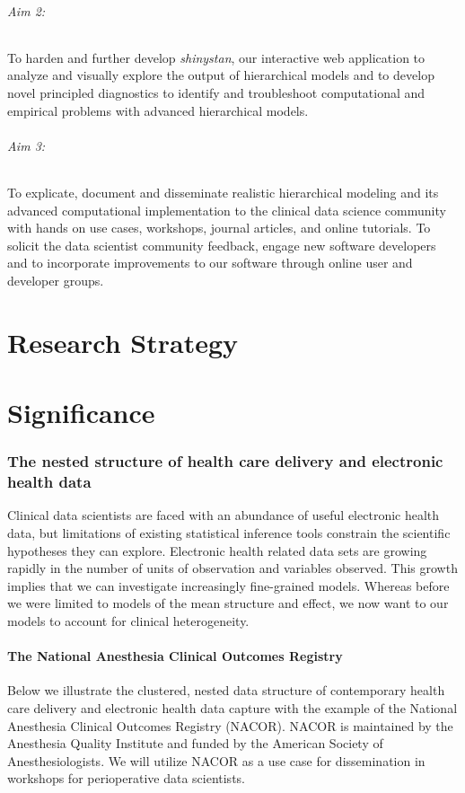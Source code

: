 \documentclass[11pt,notitlepage]{article}
\begin{document}
\paragraph*{Aim 2:} To harden and further develop \textit{shinystan}, our 
interactive web application to analyze and visually explore the output of hierarchical 
models and to develop novel principled diagnostics to identify and troubleshoot
computational and empirical problems with advanced hierarchical models.

\paragraph*{Aim 3:} To explicate, document and disseminate realistic hierarchical 
modeling and its advanced computational implementation to the 
clinical data science community with hands on use cases, workshops, journal articles, and 
online tutorials. To solicit the data scientist community feedback, engage new 
software developers and to incorporate improvements to our software through 
online user and developer groups.

\part*{Research Strategy}

\part*{Significance}

\section*{The nested structure of health care delivery and electronic health data}
Clinical data scientists are faced with an abundance of useful electronic health data, 
but limitations of existing statistical inference tools constrain the scientific 
hypotheses they can explore. Electronic health related data sets 
are growing rapidly in the number of units of observation and 
variables observed. This growth implies that we can investigate increasingly fine-grained 
models. Whereas before we were limited to models of the mean structure and effect, we 
now want to our models to account for clinical heterogeneity.

\subsection*{The National Anesthesia Clinical Outcomes Registry}
Below we illustrate the clustered, nested data structure of contemporary health 
care delivery and electronic health data capture with the example of the 
National Anesthesia Clinical Outcomes Registry (NACOR). NACOR is maintained by the 
Anesthesia Quality Institute and funded by the American Society of 
Anesthesiologists. We will utilize NACOR as a use case for dissemination in 
workshops for perioperative data scientists.
\end{document}
